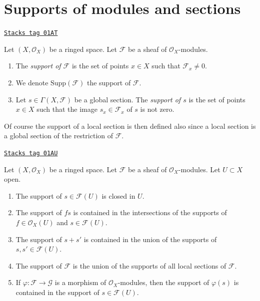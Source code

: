 \section{Supports of modules and sections}
\label{modules-section-support}
\begin{definition}[Support]
\label{modules-definition-support}
\href{https://stacks.math.columbia.edu/tag/01AT}{\texttt{Stacks tag 01AT}}

Let $(X, \mathcal{O}_X)$ be a ringed space.
Let $\mathcal{F}$ be a sheaf of $\mathcal{O}_X$-modules.
\begin{enumerate}
\item The {\it support of $\mathcal{F}$} is the set of
points $x \in X$ such that $\mathcal{F}_x \not = 0$.
\item We denote $\text{Supp}(\mathcal{F})$ the support of $\mathcal{F}$.
\item Let $s \in \Gamma(X, \mathcal{F})$ be a global section.
The {\it support of $s$} is the set of points $x \in X$
such that the image $s_x \in \mathcal{F}_x$ of $s$ is
not zero.
\end{enumerate}
\end{definition}

Of course the support of a local section is then defined also
since a local section is a global section of the restriction of
$\mathcal{F}$.

\begin{lemma}
\label{modules-lemma-support-section-closed}
\href{https://stacks.math.columbia.edu/tag/01AU}{\texttt{Stacks tag 01AU}}

Let $(X, \mathcal{O}_X)$ be a ringed space.
Let $\mathcal{F}$ be a sheaf of $\mathcal{O}_X$-modules.
Let $U \subset X$ open.
\begin{enumerate}
\item The support of $s \in \mathcal{F}(U)$ is closed in $U$.
\item The support of $fs$ is contained in the intersections
of the supports of $f \in \mathcal{O}_X(U)$ and $s \in \mathcal{F}(U)$.
\item The support of $s + s'$ is contained in the union of
the supports of $s, s' \in \mathcal{F}(U)$.
\item The support of $\mathcal{F}$ is the union of the supports
of all local sections of $\mathcal{F}$.
\item If $\varphi : \mathcal{F} \to \mathcal{G}$ is a morphism of
$\mathcal{O}_X$-modules, then the support of $\varphi(s)$ is
contained in the support of $s \in \mathcal{F}(U)$.
\end{enumerate}
\end{lemma}

